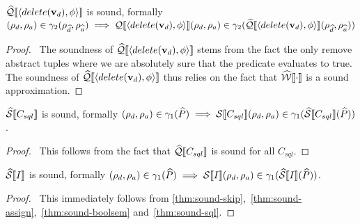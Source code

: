 \begin{conjecture}\label{thm:sound-delete}
    $\widehat{\mathcal{Q}}\llbracket \langle delete(\mathbf{v}_d), \phi \rangle \rrbracket$ is sound, formally $(\rho_d, \rho_a) \in \gamma_2(\rho_{\widehat{d}}, \rho_{\widehat{a}}) \implies \mathcal{Q}\llbracket \langle delete(\mathbf{v}_d), \phi \rangle \rrbracket(\rho_d, \rho_a) \in \gamma_2(\widehat{\mathcal{Q}}\llbracket \langle delete(\mathbf{v}_d), \phi \rangle \rrbracket(\rho_{\widehat{d}}, \rho_{\widehat{a}}))$
\end{conjecture}


\begin{proof}
    \pfsketch\
    The soundness of $\widehat{\mathcal{Q}}\llbracket \langle delete(\mathbf{v}_d), \phi \rangle \rrbracket$ stems from the fact the only remove abstract tuples where we are absolutely sure that the predicate evaluates to true.
    The soundness of $\widehat{\mathcal{Q}}\llbracket \langle delete(\mathbf{v}_d), \phi \rangle \rrbracket$ thus relies on the fact that $\widehat{\mathcal{W}}\llbracket \cdot \rrbracket$ is a sound approximation.
\end{proof}


\begin{conjecture}\label{thm:sound-sql}
    $\widehat{\mathcal{S}} \llbracket C_{sql} \rrbracket$ is sound, formally $(\rho_d, \rho_a) \in \gamma_1(\widehat{P}) \implies \mathcal{S} \llbracket C_{sql} \rrbracket(\rho_d, \rho_a) \in \gamma_1(\widehat{\mathcal{S}} \llbracket C_{sql} \rrbracket(\widehat{P}))$.
\end{conjecture}


\begin{proof}
    \pf\
    This follows from the fact that $\widehat{\mathcal{Q}}\llbracket C_{sql} \rrbracket$ is sound for all $C_{sql}$.
\end{proof}


\begin{conjecture}
    $\widehat{\mathcal{S}} \llbracket I \rrbracket$ is sound, formally $(\rho_d, \rho_a) \in \gamma_1(\widehat{P}) \implies \mathcal{S} \llbracket I \rrbracket(\rho_d, \rho_a) \in \gamma_1(\widehat{\mathcal{S}} \llbracket I \rrbracket(\widehat{P}))$.
\end{conjecture}


\begin{proof}
    \pf\
    This immediately follows from \autoref{thm:sound-skip},~\ref{thm:sound-assign},~\ref{thm:sound-boolsem} and~\ref{thm:sound-sql}.
\end{proof}
